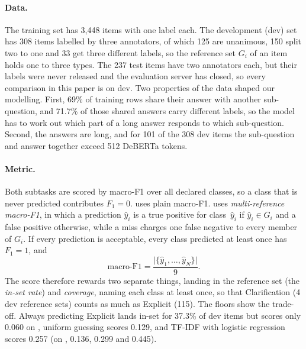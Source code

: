 \paragraph{Data.}
The training set has 3,448 items with one label each.
The development (dev) set has 308 items labelled by three annotators, of which 125 are unanimous, 150 split two to one and 33 get three different labels, so the reference set $G_i$ of an item holds one to three types.
The 237 test items have two annotators each, but their labels were never released and the evaluation server has closed, so every comparison in this paper is on dev.
Two properties of the data shaped our modelling.
First, 69\% of training rows share their answer with another sub-question, and 71.7\% of those shared answers carry different labels, so the model has to work out which part of a long answer responds to which sub-question.
Second, the answers are long, and for 101 of the 308 dev items the sub-question and answer together exceed 512 DeBERTa tokens.

\paragraph{Metric.}
Both subtasks are scored by macro-F1 over all declared classes, so a class that is never predicted contributes $F_1=0$.
\Sone{} uses plain macro-F1.
\Stwo{} uses \emph{multi-reference macro-F1}, in which a prediction $\hat{y}_i$ is a true positive for class~$\hat{y}_i$ if $\hat{y}_i \in G_i$ and a false positive otherwise, while a miss charges one false negative to every member of $G_i$.
If every prediction is acceptable, every class predicted at least once has $F_1=1$, and
\begin{equation}
  \text{macro-F1} = \frac{\lvert\{\hat{y}_1,\dots,\hat{y}_N\}\rvert}{9} .
  \label{eq:task-coverage}
\end{equation}
The score therefore rewards two separate things, landing in the reference set (the \emph{in-set rate}) and \emph{coverage}, naming each class at least once, so that Clarification (4 dev reference sets) counts as much as Explicit (115).
The floors show the trade-off.
Always predicting Explicit lands in-set for 37.3\% of dev items but scores only 0.060 on \Stwo{}, uniform guessing scores 0.129, and TF-IDF with logistic regression scores 0.257 (on \Sone{}, 0.136, 0.299 and 0.445).

